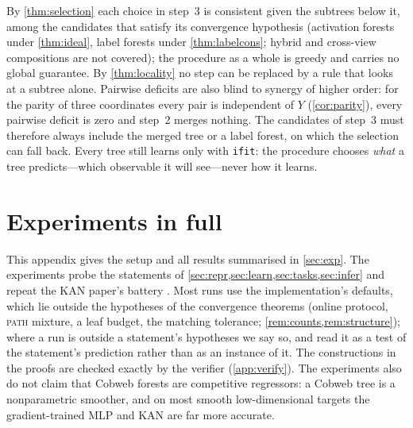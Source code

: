 \documentclass[11pt]{article}
\theoremstyle{definition}
\theoremstyle{remark}
\begin{document}
By \cref{thm:selection} each choice in step~3 is consistent given the subtrees below it,
among the candidates that satisfy its convergence hypothesis (activation forests under
\cref{thm:ideal}, label forests under \cref{thm:labelcons}; hybrid and cross-view
compositions are not covered);
the procedure as a whole is greedy and carries no global guarantee.  By
\cref{thm:locality} no step can be replaced by a rule that looks at a subtree alone.
Pairwise deficits are also blind to synergy of higher order: for the parity of three
coordinates every pair is independent of $Y$ (\cref{cor:parity}), every pairwise deficit
is zero and step~2 merges nothing.  The candidates of step~3 must therefore always
include the merged tree or a label forest, on which the selection can fall back.
Every tree still learns only with \texttt{ifit}: the procedure chooses \emph{what} a tree
predicts---which observable it will see---never how it learns.

\section{Experiments in full}\label{app:experiments}\label{sec:experiments}

This appendix gives the setup and all results summarised in \cref{sec:exp}.  The experiments probe the statements of \cref{sec:repr,sec:learn,sec:tasks,sec:infer}
and repeat the KAN paper's battery \citep{liu2024kan}.  Most runs use the
implementation's defaults, which lie outside the hypotheses of the convergence
theorems (online protocol, \textsc{path} mixture, a leaf budget, the matching tolerance;
\cref{rem:counts,rem:structure}); where a run is outside a statement's hypotheses we say
so, and read it as a test of the statement's prediction rather than as an instance of it.
The constructions in the proofs are checked exactly by the verifier (\cref{app:verify}).
The experiments also do not claim that Cobweb forests are competitive regressors: a
Cobweb tree is a nonparametric smoother, and on most smooth low-dimensional targets the
gradient-trained MLP and KAN are far more accurate.
\end{document}
